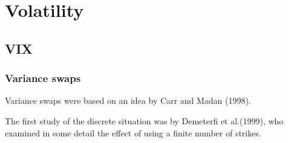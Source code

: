 \chapter{Volatility}

\section{VIX}

\subsection{Variance swaps}

Variance swaps were based on an idea by Carr and Madan (1998)\cite{Carr_Madan_1998}.

The first study of the discrete situation was by Demeterfi et al.(1999)\cite{Demeterfi_1999_2}, who examined in some detail the effect of using a finite number of strikes.
